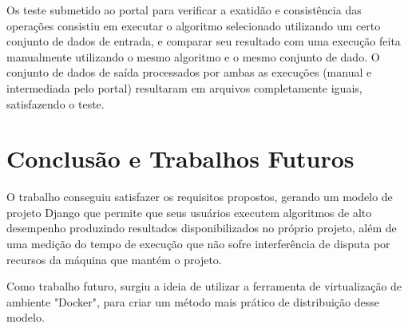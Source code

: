 \documentclass[tg]{mdtufsm}
\begin{document}
Os teste submetido ao portal para verificar a exatidão e consistência das operações consistiu em executar o algoritmo selecionado utilizando um certo conjunto de dados de entrada, e comparar seu resultado com uma execução feita manualmente utilizando o mesmo algoritmo e o mesmo conjunto de dado. O conjunto de dados de saída processados por ambas as execuções (manual e intermediada pelo portal) resultaram em arquivos completamente iguais, satisfazendo o teste.

\chapter{Conclusão e Trabalhos Futuros}
O trabalho conseguiu satisfazer os requisitos propostos, gerando um modelo de projeto Django que permite que seus usuários executem algoritmos de alto desempenho produzindo resultados disponibilizados no próprio projeto, além de uma medição do tempo de execução que não sofre interferência de disputa por recursos da máquina que mantém o projeto.

Como trabalho futuro, surgiu a ideia de utilizar a ferramenta de virtualização de ambiente "Docker", para criar um método mais prático de distribuição desse modelo.

\setlength{\baselineskip}{\baselineskip}


\end{document}
